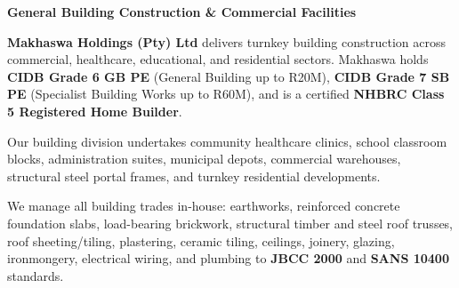 \documentclass[a4paper,11pt]{article}
\begin{document}
\noindent
\begin{minipage}[t]{0.62\textwidth}
    \vspace{0pt}
    {\large\bfseries\color{mhnavy} General Building Construction \& Commercial Facilities}
    \vspace{0.12cm}

    {\fontsize{9pt}{13pt}\selectfont\color{mhtext}
    \textbf{Makhaswa Holdings (Pty) Ltd} delivers turnkey building construction across commercial, healthcare, educational, and residential sectors. Makhaswa holds \textbf{CIDB Grade 6 GB PE} (General Building up to R20M), \textbf{CIDB Grade 7 SB PE} (Specialist Building Works up to R60M), and is a certified \textbf{NHBRC Class 5 Registered Home Builder}.
    }

    \vspace{0.22cm}

    {\fontsize{9pt}{13pt}\selectfont\color{mhtext}
    Our building division undertakes community healthcare clinics, school classroom blocks, administration suites, municipal depots, commercial warehouses, structural steel portal frames, and turnkey residential developments.
    }

    \vspace{0.22cm}

    {\fontsize{9pt}{13pt}\selectfont\color{mhtext}
    We manage all building trades in-house: earthworks, reinforced concrete foundation slabs, load-bearing brickwork, structural timber and steel roof trusses, roof sheeting/tiling, plastering, ceramic tiling, ceilings, joinery, glazing, ironmongery, electrical wiring, and plumbing to \textbf{JBCC 2000} and \textbf{SANS 10400} standards.
    }
\end{minipage}
\hfill
\end{document}
